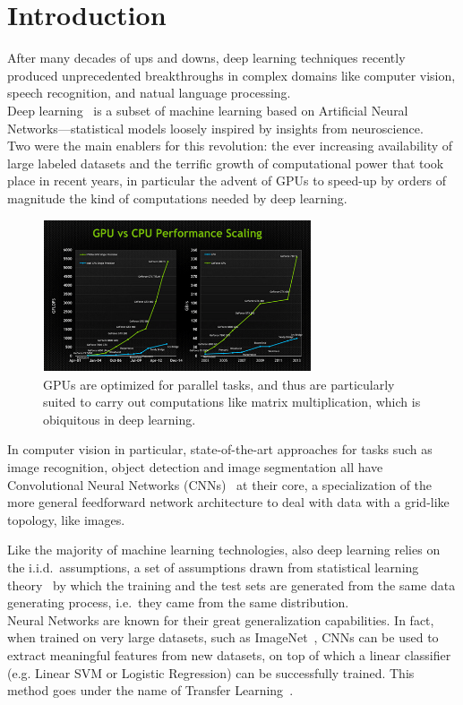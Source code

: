 \documentclass[../main.tex]{subfiles}
\begin{document}
    \chapter{Introduction}\label{chap:intro}

    After many decades of ups and downs, deep learning techniques recently produced unprecedented breakthroughs
    in complex domains like computer vision, speech recognition, and natual language processing. \\
    Deep learning~\cite{deeplearning} is a subset of machine learning based on Artificial Neural Networks---statistical models loosely
    inspired by insights from neuroscience. \\
    Two were the main enablers for this revolution: the ever increasing availability of large labeled
    datasets and the terrific growth of computational power that took place in recent years, in particular
    the advent of GPUs to speed-up by orders of magnitude the kind of computations needed by deep learning.

    \begin{figure}[h!]
        \centering{}
        \includegraphics[width=300px]{img/gpu-vs-cpu.png}
        \caption{GPUs are optimized for parallel tasks, and thus are particularly suited to carry out computations
        like matrix multiplication, which is obiquitous in deep learning.}\label{fig:gpu-vs-cpu}
    \end{figure}

    In computer vision in particular, state-of-the-art approaches for tasks such as image recognition,
    object detection and image segmentation all have Convolutional Neural Networks (CNNs)~\cite{lecun-89e} at their core,
	a specialization of the more general feedforward network architecture to deal with data with a grid-like topology,
    like images.

    Like the majority of machine learning technologies, also deep learning relies on the i.i.d.\ assumptions,
    a set of assumptions drawn from statistical learning theory~\cite{Vapnik1998} by which the training and the test sets are generated
    from the same data generating process, i.e.\ they came from the same distribution. \\
    Neural Networks are known for their great generalization capabilities. In fact, when trained on very large
    datasets, such as ImageNet~\cite{imagenet}, CNNs can be used to extract meaningful features from new datasets, on top of which
    a linear classifier (e.g. Linear SVM or Logistic Regression) can be successfully trained.
    This method goes under the name of Transfer Learning~\cite{transfer-learning}. \\
\end{document}
